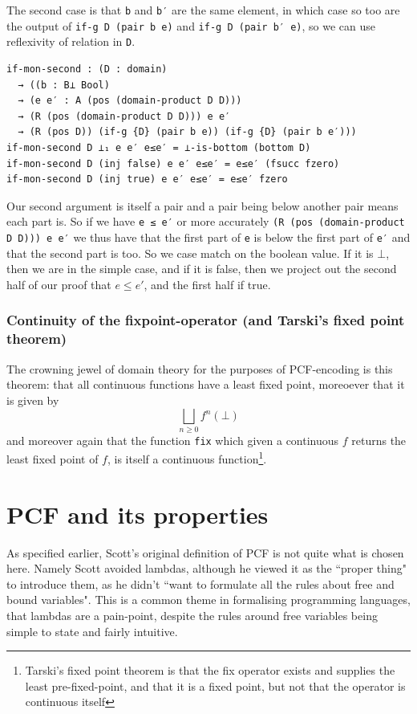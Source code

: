\documentclass[12pt,a4paper,twoside,openright]{report}
\begin{document}
The second case is that \texttt{b} and \texttt{b′} are the same element, in which case so too are the output of \texttt{if-g {D} (pair b e)} and \texttt{if-g {D} (pair b′ e)}, so we can use reflexivity of relation in \texttt{D}. 
\begin{verbatim}
if-mon-second : (D : domain)
  → ((b : B⊥ Bool)
  → (e e′ : A (pos (domain-product D D)))
  → (R (pos (domain-product D D))) e e′
  → (R (pos D)) (if-g {D} (pair b e)) (if-g {D} (pair b e′)))
if-mon-second D ⊥₁ e e′ e≤e′ = ⊥-is-bottom (bottom D)
if-mon-second D (inj false) e e′ e≤e′ = e≤e′ (fsucc fzero) 
if-mon-second D (inj true) e e′ e≤e′ = e≤e′ fzero
\end{verbatim}
Our second argument is itself a pair and a pair being below another pair means each part is. So if we have \texttt{e ≤ e′} or more accurately \texttt{(R (pos (domain-product D D))) e e′} we thus have that the first part of \texttt{e} is below the first part of \texttt{e′} and that the second part is too. So we case match on the boolean value. If it is $\bot$, then we are in the simple case, and if it is false, then we project out the second half of our proof that $e \leq e′$, and the first half if true. 
\subsubsection{Continuity of the fixpoint-operator (and Tarski's fixed point theorem)}
The crowning jewel of domain theory for the purposes of PCF-encoding is this theorem: that all continuous functions have a least fixed point, moreoever that it is given by
\[
\bigsqcup_{n \geq 0} f^n(\bot)
\]
and moreover again that the function \texttt{fix} which given a continuous $f$ returns the least fixed point of $f$, is itself a continuous function\footnote{Tarski's fixed point theorem is that the fix operator exists and supplies the least pre-fixed-point, and that it is a fixed point, but not that the operator is continuous itself}.
\section{PCF and its properties}
As specified earlier, Scott's original definition of PCF is not quite what is chosen here. Namely Scott avoided lambdas, although he viewed it as the ``proper thing" to introduce them, as he didn't ``want to formulate all the rules about free and bound variables". This is a common theme in formalising programming languages, that lambdas are a pain-point, despite the rules around free variables being simple to state and fairly intuitive. 
\end{document}
